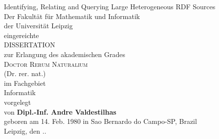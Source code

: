 \documentclass[ oneside,openright,titlepage,numbers=noenddot,headinclude,%
                footinclude=true,cleardoublepage=empty,abstractoff, %
                BCOR=5mm,paper=a4,fontsize=11pt,%
                 ngerman,american,%
                ]{scrreprt}
\begin{document}
\renewcommand{\thepage}{\Roman{page}}

\begin{titlepage}

\begin{center}
\large

$\quad$\\
$\quad$\\
{\Huge Identifying, Relating and Querying Large Heterogeneous RDF Sources}\\
\vspace{1cm}
Der Fakult\"at f\"ur Mathematik und Informatik\\
der Universit\"at Leipzig\\
eingereichte\\
\vspace{1cm}
{\Huge DISSERTATION}\\
\vspace{1cm}
zur Erlangung des akademischen Grades\\
\vspace{1cm}
{\Large \scshape{Doctor Rerum Naturalium}}\\
(Dr. rer. nat.)\\
\vspace{1cm}
im Fachgebiet\\
{\large Informatik}\\
\vspace{1cm}
vorgelegt\\
\vspace{1cm}
{von \textbf{Dipl.-Inf. Andre Valdestilhas}}\\
\vspace{1cm}
geboren am 14. Feb. 1980 in Sao Bernardo do Campo-SP, Brazil\\
\vspace{1cm}
Leipzig, den \the\day.\the\month.\the\year

\vfill

\end{center}
\cleardoublepage
\end{titlepage}
\end{document}

